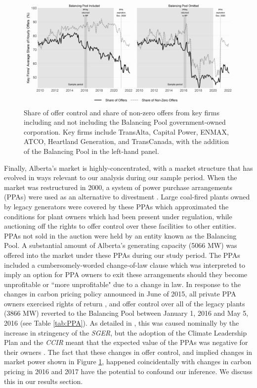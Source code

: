 \documentclass[12pt]{article}
\begin{document}
\begin{figure}[!h]
    \centering
    \begin{minipage}{\textwidth}
        \centering
        \includegraphics[width=.9\textwidth]{../images/mkt_power.png}
        \caption{Share of offer control and share of non-zero offers from key firms including and not including the Balancing Pool government-owned corporation. Key firms include TransAlta, Capital Power, ENMAX, ATCO, Heartland Generation, and TransCanada, with the addition of the Balancing Pool in the left-hand panel.}
    \label{fig:mkt_power}
    \end{minipage}%
\end{figure}


Finally, Alberta's market is highly-concentrated, with a market structure that has evolved in ways relevant to our analysis during our sample period. When the market was restructured in 2000, a system of power purchase arrangements (PPAs) were used as an alternative to divestment \cite{kleit_electricity_2007}. Large coal-fired plants owned by legacy generators were covered by these PPAs which approximated the conditions for plant owners which had been present under regulation, while auctioning off the rights to offer control over these facilities to other entities. PPAs not sold in the auction were held by an entity known as the Balancing Pool. A substantial amount of Alberta's generating capacity (5066 MW) was offered into the market under these PPAs during our study period. The PPAs included a cumbersomely-worded change-of-law clause which was interpreted to imply an option for PPA owners to exit these arrangements should they become unprofitable or ``more unprofitable" due to a change in law. In response to the changes in carbon pricing policy announced in June of 2015, all private PPA owners exercised rights of return \cite{bankes_termination_2016}, and offer control over all of the legacy plants (3866 MW) reverted to the Balancing Pool between January 1, 2016 and May 5, 2016 (see Table \ref{tab:PPA}). As detailed in \cite{leach_tombe_ppa}, this was caused nominally by the increase in stringency of the \textit{SGER}, but the adoption of the Climate Leadership Plan and the \textit{CCIR} meant that the expected value of the PPAs was negative for their owners \cite{leach_tombe_ppa}. The fact that these changes in offer control, and implied changes in market power shown in Figure \ref{fig:mkt_power}, happened coincidentally with changes in carbon pricing in 2016 and 2017 have the potential to confound our inference. We discuss this in our results section.
\end{document}
